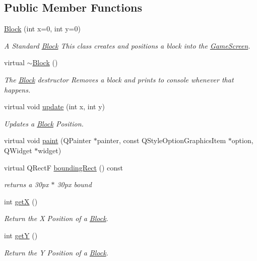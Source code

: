 \subsection*{Public Member Functions}
\begin{DoxyCompactItemize}
\item 
\hyperlink{class_block_aada344df339d2124eeaa726367ae27fe}{Block} (int x=0, int y=0)
\begin{DoxyCompactList}\small\item\em A Standard \hyperlink{class_block}{Block} This class creates and positions a block into the \hyperlink{class_game_screen}{Game\-Screen}. \end{DoxyCompactList}\item 
virtual \hyperlink{class_block_a19d1bd0e1cef6a865ed2745a2e648405}{$\sim$\-Block} ()
\begin{DoxyCompactList}\small\item\em The \hyperlink{class_block}{Block} destructor Removes a block and prints to console whenever that happens. \end{DoxyCompactList}\item 
virtual void \hyperlink{class_block_aa374e103c2ba9e060c4689f4da21a9ff}{update} (int x, int y)
\begin{DoxyCompactList}\small\item\em Updates a \hyperlink{class_block}{Block} Position. \end{DoxyCompactList}\item 
virtual void \hyperlink{class_block_a8f526f6d76bf11afae85d8b23239cce2}{paint} (Q\-Painter $\ast$painter, const Q\-Style\-Option\-Graphics\-Item $\ast$option, Q\-Widget $\ast$widget)
\item 
virtual Q\-Rect\-F \hyperlink{class_block_aee4444b92a82f5a8080e9019ef1e554d}{bounding\-Rect} () const 
\begin{DoxyCompactList}\small\item\em returns a 30px $\ast$ 30px bound \end{DoxyCompactList}\item 
int \hyperlink{class_block_a527c8f990b4b99dda6f4ca225ee32c14}{get\-X} ()
\begin{DoxyCompactList}\small\item\em Return the X Position of a \hyperlink{class_block}{Block}. \end{DoxyCompactList}\item 
int \hyperlink{class_block_a2501c303a7975db005ddc49d9551a51b}{get\-Y} ()
\begin{DoxyCompactList}\small\item\em Return the Y Position of a \hyperlink{class_block}{Block}. \end{DoxyCompactList}\item 

\end{DoxyCompactItemize}
